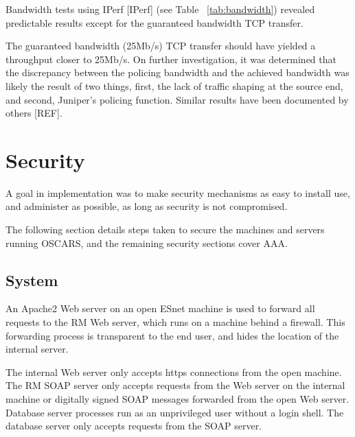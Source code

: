 \documentclass[conference]{IEEEtran}
\begin{document}
Bandwidth tests using IPerf [IPerf] (see Table ~\ref{tab:bandwidth}) revealed predictable results except for the guaranteed bandwidth TCP transfer.

The guaranteed bandwidth (25Mb/s) TCP transfer should have yielded a 
throughput closer to 25Mb/s.  On further investigation, it was determined 
that the 
discrepancy between the policing bandwidth and the achieved bandwidth was 
likely the result of two things, first, the lack of traffic shaping at the 
source end, and second, Juniper's policing function.  Similar results have 
been documented by others [REF].


\section{Security}
A goal in implementation was to make security mechanisms as easy to install
use, and administer as possible, as long as security is not compromised.

The following section details steps taken to secure the machines and 
servers running OSCARS, and the remaining security sections cover AAA.

\subsection{System}

An Apache2 Web server on an open ESnet machine is used to forward all 
requests to the RM Web server, which runs on a machine behind a firewall. 
This forwarding process is transparent to the end user, and hides the location 
of the internal server.

The internal Web server only accepts https connections from the open machine.
The RM SOAP server only accepts requests from the Web server on the internal machine
or digitally signed SOAP messages forwarded from the open Web server.
Database server processes run as an unprivileged user without a login 
shell.  The database server only accepts requests from the SOAP server.
\end{document}
